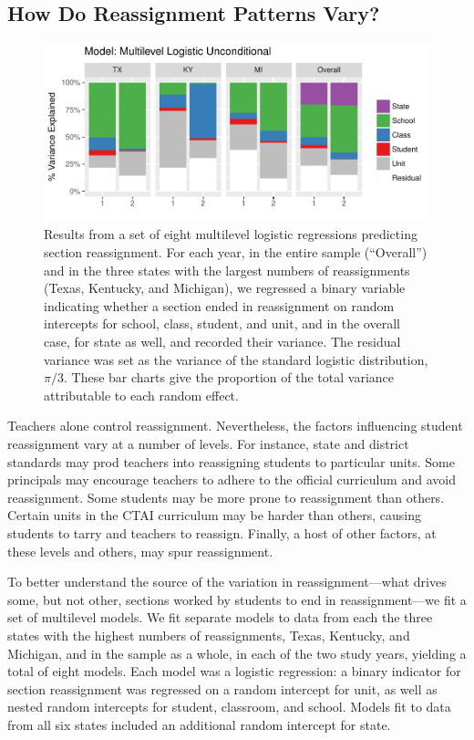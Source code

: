 \documentclass[12pt]{article}\usepackage[]{graphicx}\usepackage[]{color}
\makeatletter
\def\maxwidth{ %
  \ifdim\Gin@nat@width>\linewidth
    \linewidth
  \else
    \Gin@nat@width
  \fi
}
\makeatother
\begin{document}
\subsection{How Do Reassignment Patterns Vary?}

\begin{figure}
  \centering

\includegraphics[width=\maxwidth]{figure/vcs-1} 

\caption{Results from a set of eight multilevel logistic regressions
  predicting section reassignment. For each year, in the entire sample (``Overall'')
  and in the three states with the largest numbers of reassignments (Texas,
  Kentucky, and Michigan), we regressed a binary variable indicating
  whether a section ended in reassignment on random intercepts for
  school, class, student, and unit, and in the overall case, for state
  as well, and recorded their variance. The residual variance was set
  as the variance of the standard logistic distribution,
  $\pi/3$. These bar charts give the proportion of the total variance
  attributable to each random effect.}
\label{fig:vc}
\end{figure}
Teachers alone control reassignment.
Nevertheless, the factors influencing student reassignment vary at a
number of levels.
For instance, state and district standards may prod teachers into
reassigning students to particular units.
Some principals may encourage teachers to adhere to the official
curriculum and avoid reassignment.
Some students may be more prone to reassignment than others.
Certain units in the CTAI curriculum may be harder than others,
causing students to tarry and teachers to reassign.
Finally, a host of other factors, at these levels and others, may spur reassignment.

To better understand the source of the variation in
reassignment---what drives some, but not other, sections worked by
students to end in
reassignment---we fit a set of multilevel models.
We fit separate models to data from each the three states with the highest numbers of reassignments, Texas,
Kentucky, and Michigan, and in the sample as a whole, in each of the
two study years, yielding a total of eight models.
Each model was a logistic regression: a binary indicator for section
reassignment was regressed on a random intercept for unit, as well as
nested random intercepts for student, classroom, and school.
Models fit to data from all six states included an additional random
intercept for state.
\end{document}
